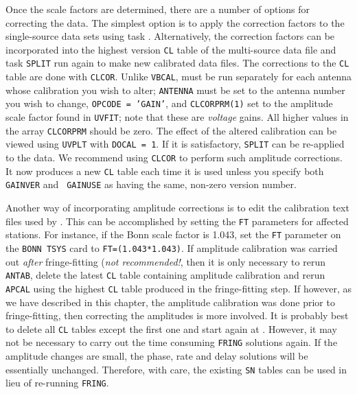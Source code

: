 Once the scale factors are determined, there are a number of options
for correcting the data.  The simplest option is to apply the
correction factors to the single-source data sets using task
{\tt {}}\@.  Alternatively, the correction factors can be
incorporated into the highest version {\tt CL} table of the
multi-source data file and task {\tt SPLIT} run again to make new
calibrated data files.  The corrections to the {\tt CL} table are done
with {\tt CLCOR}\@.  Unlike {\tt VBCAL}, {\tt {}} must be
run separately for each antenna whose calibration you wish to alter;
{\tt ANTENNA} must be set to the antenna number you wish to change,
{\tt OPCODE = 'GAIN'}, and {\tt CLCORPRM(1)} set to the amplitude
scale factor found in {\tt UVFIT}; note that these are {\it voltage}
gains.  All higher values in the array {\tt CLCORPRM} should be zero.
The effect of the altered calibration can be viewed using {\tt UVPLT}
with {\tt DOCAL = 1}.  If it is satisfactory, {\tt SPLIT} can be
re-applied to the data.  We recommend using {\tt CLCOR} to perform
such amplitude corrections.  It now produces a new {\tt CL} table each
time it is used unless you specify both {\tt GAINVER} and {\tt
GAINUSE} as having the same, non-zero version number.

Another way of incorporating amplitude corrections is to edit the
calibration text files used by {\tt {}}\@.  This can be
accomplished by setting the {\tt FT} parameters for affected stations.
For instance, if the Bonn scale factor is 1.043, set the {\tt FT}
parameter on the {\tt BONN TSYS} card to {\tt FT=(1.043*1.043)}.  If
amplitude calibration was carried out {\it after\/} fringe-fitting
({\it not recommended!\/}, then it is only necessary to rerun {\tt
ANTAB}, delete the latest {\tt CL} table containing amplitude
calibration and rerun {\tt APCAL} using the highest {\tt CL} table
produced in the fringe-fitting step.  If however, as we have described
in this chapter, the amplitude calibration was done prior to
fringe-fitting, then correcting the amplitudes is more involved.  It
is probably best to delete all {\tt CL} tables except the first one
and start again at .  However, it may not be necessary
to carry out the time consuming {\tt FRING} solutions again.  If the
amplitude changes are small, the phase, rate and delay solutions will
be essentially unchanged.  Therefore, with care, the existing {\tt SN}
tables can be used in lieu of re-running {\tt FRING}\@.


